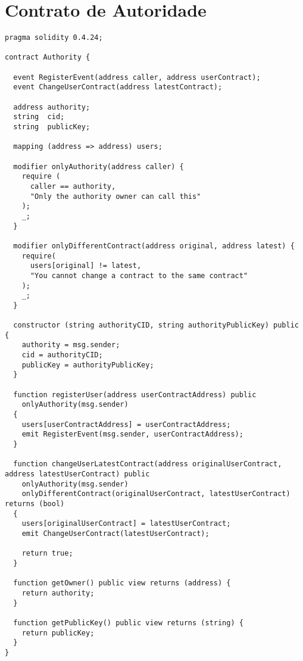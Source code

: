 \chapter{Contrato de Autoridade}\label{anexo:contrato-autoridade}

\begin{lstlisting}
pragma solidity 0.4.24;

contract Authority {

  event RegisterEvent(address caller, address userContract);
  event ChangeUserContract(address latestContract);

  address authority;
  string  cid;
  string  publicKey;

  mapping (address => address) users;

  modifier onlyAuthority(address caller) {
    require (
      caller == authority,
      "Only the authority owner can call this"
    );
    _;
  }

  modifier onlyDifferentContract(address original, address latest) {
    require(
      users[original] != latest,
      "You cannot change a contract to the same contract"
    );
    _;
  }

  constructor (string authorityCID, string authorityPublicKey) public {
    authority = msg.sender;
    cid = authorityCID;
    publicKey = authorityPublicKey;
  }

  function registerUser(address userContractAddress) public 
    onlyAuthority(msg.sender)
  {
    users[userContractAddress] = userContractAddress;
    emit RegisterEvent(msg.sender, userContractAddress);
  }

  function changeUserLatestContract(address originalUserContract, address latestUserContract) public 
    onlyAuthority(msg.sender)
    onlyDifferentContract(originalUserContract, latestUserContract) returns (bool) 
  {  
    users[originalUserContract] = latestUserContract;
    emit ChangeUserContract(latestUserContract);

    return true;
  }

  function getOwner() public view returns (address) {
    return authority;
  }

  function getPublicKey() public view returns (string) {
    return publicKey;
  }
}
\end{lstlisting}